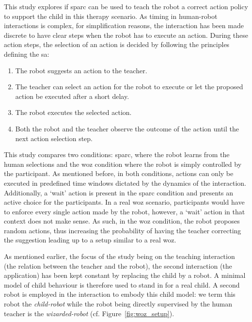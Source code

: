 This study explores if \gls{sparc} can be used to teach the robot a correct action policy to support the child in this therapy scenario. As timing in human-robot interactions is complex, for simplification reasons, the interaction has been made discrete to have clear steps when the robot has to execute an action. During these action steps, the selection of an action is decided by following the principles defining the \gls{sa}:
\begin{enumerate}
	\item The robot suggests an action to the teacher.
	\item The teacher can select an action for the robot to execute or let the proposed action be executed after a short delay.
	\item The robot executes the selected action.
	\item Both the robot and the teacher observe the outcome of the action until the next action selection step.
\end{enumerate}



This study compares two conditions: \gls{sparc}, where the robot learns from the human selections and the \gls{woz} condition where the robot is simply controlled by the participant. As mentioned before, in both conditions, actions can only be executed in predefined time windows dictated by the dynamics of the interaction. Additionally, a `wait' action is present in the \gls{sparc} condition and presents an active choice for the participants. 
In a real \gls{woz} scenario, participants would have to enforce every single action made by the robot, however, a `wait' action in that context does not make sense. As such, in the \gls{woz} condition, the robot proposes random actions, thus increasing the probability of having the teacher correcting the suggestion leading up to a setup similar to a real \gls{woz}.

As mentioned earlier, the focus of the study being on the teaching interaction (the relation between the teacher and the robot), the second interaction (the application) has been kept constant by replacing the child by a robot. A minimal model of child behaviour is therefore used to stand in for a real child. A second robot is employed in the interaction to embody this child model: we term this robot the \textit{child-robot} while the robot being directly supervised by the human teacher is the \textit{wizarded-robot} (cf. Figure~\ref{fig:woz_setup}).

